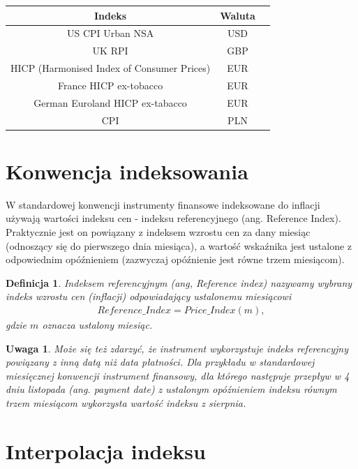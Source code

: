 \documentclass{mini}
\theoremstyle{mythstyle}
\newtheorem{Definicja}{Definicja}[chapter]
\newtheorem{Uwaga}{Uwaga}[chapter]
\begin{document}
	\begin{center}
		\begin{tabular}{c  c c}
			\textbf{Indeks} & \textbf{Waluta}  \\ \hline
			US CPI Urban NSA & USD \\
			UK RPI & GBP \\
			HICP (Harmonised Index of Consumer Prices) & EUR \\
			France HICP ex-tobacco & EUR \\
			German Euroland HICP ex-tabacco & EUR  \\
			CPI & PLN \\
		\end{tabular}
	\end{center}

	\section{Konwencja indeksowania}
	
	W standardowej konwencji instrumenty finansowe indeksowane do inflacji używają wartości indeksu cen - indeksu referencyjnego (ang. Reference Index). Praktycznie jest on powiązany z indeksem wzrostu cen za dany miesiąc (odnoszący się do pierwszego dnia miesiąca), a wartość wskaźnika jest ustalone z odpowiednim opóźnieniem (zazwyczaj opóźnienie jest równe trzem miesiącom).\\
	
	\begin{Definicja}
		Indeksem referencyjnym (ang, Reference index) nazywamy wybrany indeks wzrostu cen (inflacji) odpowiadający ustalonemu miesiącowi
	\begin{eqnarray*}
		Reference\_Index = Price\_Index(m),
	\end{eqnarray*}
	gdzie $m$ oznacza ustalony miesiąc.\\
	\end{Definicja}

	\begin{Uwaga}
	Może się też zdarzyć, że instrument wykorzystuje indeks referencyjny powiązany z inną datą niż data płatności. Dla przykładu w standardowej miesięcznej konwencji instrument finansowy, dla którego następuje przepływ w 4 dniu listopada (ang. payment date) z ustalonym opóźnieniem indeksu równym trzem miesiącom wykorzysta wartość indeksu z sierpnia. 
	\end{Uwaga}

	\section{Interpolacja indeksu}
	
\end{document}
